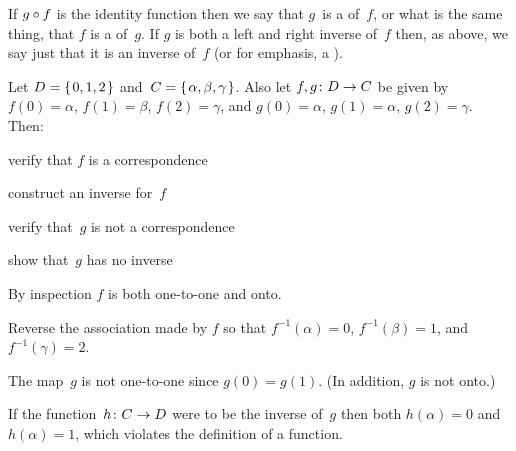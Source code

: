 \documentclass{test}  %
\begin{document}
If $g\mathbin{\circ} f$ is the identity function then we say that 
$g$~is a  of~$f$\!, or what is the
same thing, that $f$ is a  of~$g$.
If $g$ is both a left and right inverse of~$f$ then, 
as above, we say just that it is
an inverse of~$f$ (or for emphasis, a ). 

\begin{problem}
Let $D=\mbox{$\{\hspace{0.1em}0,1,2\hspace{0.1em}\}$}$ and~$C=\mbox{$\{\hspace{0.1em}\alpha,\beta,\gamma\hspace{0.1em}\}$}$.
Also let $\mbox{$f,g\colon D\to C$}$ be given by
$f(0)=\alpha$, $f(1)=\beta$, $f(2)=\gamma$, and
$g(0)=\alpha$, $g(1)=\alpha$, $g(2)=\gamma$.
Then:
\begin{items}
\item verify that $f$ is a correspondence
\item construct an inverse for~$f$\!
\item verify that~$g$ is not a correspondence
\item show that~$g$ has no inverse 
\end{items}
\begin{answer}
\begin{items}
\item By inspection $f$ is both one-to-one and onto.
\item Reverse the association made by $f$ so that $f^{-1}(\alpha)=0$,
  $f^{-1}(\beta)=1$, and~$f^{-1}(\gamma)=2$.
\item The map~$g$ is not one-to-one since $g(0)=g(1)$.
  (In addition, $g$ is not onto.) 
\item If the function~$\mbox{$h\colon C\to D$}$ were to be the inverse of~$g$
  then both $h(\alpha)=0$ and~$h(\alpha)=1$, 
  which violates the definition of a function.   
\end{items}
\end{answer}
\end{problem}
\end{document}
